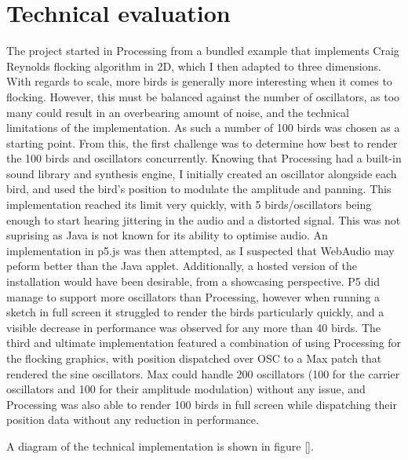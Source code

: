 \documentclass[journal, a4paper]{IEEEtran}
\begin{document}
\section*{Technical evaluation}
The project started in Processing from a bundled example that implements Craig Reynolds flocking algorithm \cite{reynolds} in 2D, which I then adapted to three dimensions. With regards to scale, more birds is generally more interesting when it comes to flocking. However, this must be balanced against the number of oscillators, as too many could result in an overbearing amount of noise, and the technical limitations of the implementation. As such a number of 100 birds was chosen as a starting point. From this, the first challenge was to determine how best to render the 100 birds and oscillators concurrently. Knowing that Processing had a built-in sound library and synthesis engine, I initially created an oscillator alongside each bird, and used the bird's position to modulate the amplitude and panning. This implementation reached its limit very quickly, with 5 birds/oscillators being enough to start hearing jittering in the audio and a distorted signal. This was not suprising as Java is not known for its ability to optimise audio.
An implementation in p5.js was then attempted, as I suspected that WebAudio may peform better than the Java applet. Additionally, a hosted version of the installation would have been desirable, from a showcasing perspective. P5 did manage to support more oscillators than Processing, however when running a sketch in full screen it struggled to render the birds particularly quickly, and a visible decrease in performance was observed for any more than 40 birds. The third and ultimate implementation featured a combination of using Processing for the flocking graphics, with position dispatched over OSC to a Max patch that rendered the sine oscillators. Max could handle 200 oscillators (100 for the carrier oscillators and 100 for their amplitude modulation) without any issue, and Processing was also able to render 100 birds in full screen while dispatching their position data without any reduction in performance.

A diagram of the technical implementation is shown in figure \ref{}.
\end{document}

